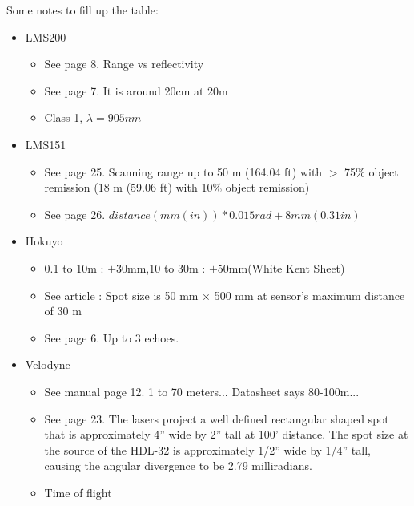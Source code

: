 Some notes to fill up the table:
\begin{itemize}
    \item LMS200
        \begin{itemize}
            \item See page 8. Range vs reflectivity
            \item See page 7. It is around 20cm at 20m
            \item Class 1, $\lambda=905 nm$
        \end{itemize}
    \item LMS151
        \begin{itemize}
            \item See page 25. Scanning range up to 50 m (164.04 ft) with $>$ 75\% object remission (18 m (59.06 ft) with 10\% object remission)
            \item See page 26. $distance(mm (in)) * 0.015 rad + 8 mm (0.31 in)$
        \end{itemize}
    \item Hokuyo
        \begin{itemize}
            \item 0.1 to 10m : $\pm$30mm,10 to 30m : $\pm$50mm(White Kent Sheet)
            \item See article : Spot size is 50 mm × 500 mm at sensor’s maximum distance of 30 m
            \item See page 6. Up to 3 echoes.
        \end{itemize}
    \item Velodyne
        \begin{itemize}
            \item See manual page 12. 1 to 70 meters... Datasheet says 80-100m...
            \item See page 23. The lasers project a well defined rectangular shaped spot that is approximately 4” wide by 2” tall at 100’ distance. The spot size at the source of the HDL-32 is approximately 1/2” wide by 1/4” tall, causing the angular divergence to be 2.79 milliradians.
            \item Time of flight
        \end{itemize}
\end{itemize}

